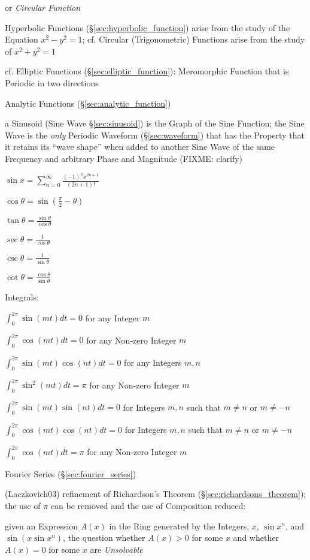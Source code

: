 or \emph{Circular Function}

Hyperbolic Functions (\S\ref{sec:hyperbolic_function}) arise from the study of
the Equation $x^2 - y^2 = 1$; cf. Circular (Trigonometric) Functions arise from
the study of $x^2 + y^2 = 1$

cf. Elliptic Functions (\S\ref{sec:elliptic_function}): Meromorphic Function
that is Periodic in two directions

Analytic Functions (\S\ref{sec:analytic_function})

a Sinusoid (Sine Wave \S\ref{sec:sinusoid}) is the Graph of the Sine Function;
the Sine Wave is the \emph{only} Periodic Waveform (\S\ref{sec:waveform}) that
has the Property that it retains its ``wave shape'' when added to another Sine
Wave of the same Frequency and arbitrary Phase and Magnitude (FIXME: clarify)

$\sin x = \sum_{n=0}^\infty \frac{(-1)^n x^{2n+1}}{(2n + 1)!}$

$\cos\theta= \sin(\frac{\pi}{2} - \theta)$

$\tan\theta = \frac{\sin\theta}{\cos\theta}$

$\sec\theta = \frac{1}{\cos\theta}$

$\csc\theta = \frac{1}{\sin\theta}$

$\cot\theta = \frac{\cos\theta}{\sin\theta}$

Integrals:

$\int_0^{2\pi} \sin(mt)dt = 0$ for any Integer $m$

$\int_0^{2\pi} \cos(mt)dt = 0$ for any Non-zero Integer $m$

$\int_0^{2\pi} \sin(mt)\cos(nt)dt = 0$ for any Integers $m,n$

$\int_0^{2\pi} \sin^2(mt)dt = \pi$ for any Non-zero Integer $m$

$\int_0^{2\pi} \sin(mt)\sin(nt)dt = 0$ for Integers $m,n$ such that $m\neq{n}$
or $m\neq{-n}$

$\int_0^{2\pi} \cos(mt)\cos(nt)dt = 0$ for Integers $m,n$ such that $m\neq{n}$
or $m\neq{-n}$

$\int_0^{2\pi} \cos(mt)dt = \pi$ for any Non-zero Integer $m$

\fist Fourier Series (\S\ref{sec:fourier_series})

(Laczkovich03) refinement of Richardson's Theorem
(\S\ref{sec:richardsons_theorem}); the use of $\pi$ can be removed and the use
of Composition reduced:

given an Expression $A(x)$ in the Ring generated by the Integers, $x$, $\sin
x^n$, and $\sin(x \sin x^n)$, the question whether $A(x) > 0$ for some $x$ and
whether $A(x) = 0$ for some $x$ are \emph{Unsolvable}



